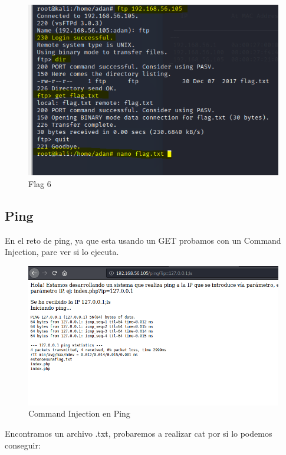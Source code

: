 \documentclass[12pt,twoside]{article}
\begin{document}
\begin{figure}[h]
    \centering
    \includegraphics[scale=0.5]{./imagenes/ftp_flag}
    \caption{Flag 6}
\end{figure}


\subsection{Ping}
En el reto de ping, ya que esta usando un GET probamos con un Command Injection, pare ver si lo ejecuta. 
\begin{figure}[h]
    \centering
    \includegraphics[scale=0.5]{./imagenes/ping}
    \caption{Command Injection en Ping}
\end{figure}

Encontramos un archivo .txt, probaremos a realizar cat por si lo podemos conseguir:
\end{document}

